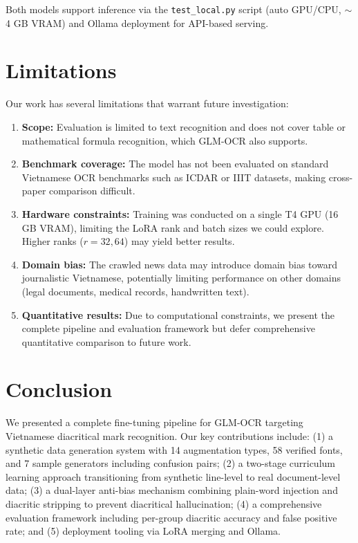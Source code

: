 \documentclass[11pt]{article}
\begin{document}
Both models support inference via the \texttt{test\_local.py} script (auto GPU/CPU, $\sim$4 GB VRAM) and Ollama deployment for API-based serving.

\section{Limitations}

Our work has several limitations that warrant future investigation:

\begin{enumerate}[nosep,leftmargin=*]
    \item \textbf{Scope:} Evaluation is limited to text recognition and does not cover table or mathematical formula recognition, which GLM-OCR also supports.
    \item \textbf{Benchmark coverage:} The model has not been evaluated on standard Vietnamese OCR benchmarks such as ICDAR or IIIT datasets, making cross-paper comparison difficult.
    \item \textbf{Hardware constraints:} Training was conducted on a single T4 GPU (16 GB VRAM), limiting the LoRA rank and batch sizes we could explore. Higher ranks ($r{=}32, 64$) may yield better results.
    \item \textbf{Domain bias:} The crawled news data may introduce domain bias toward journalistic Vietnamese, potentially limiting performance on other domains (legal documents, medical records, handwritten text).
    \item \textbf{Quantitative results:} Due to computational constraints, we present the complete pipeline and evaluation framework but defer comprehensive quantitative comparison to future work.
\end{enumerate}

\section{Conclusion}

We presented a complete fine-tuning pipeline for GLM-OCR targeting Vietnamese diacritical mark recognition. 
Our key contributions include: (1) a synthetic data generation system with 14 augmentation types, 58 verified fonts, and 7 sample generators including confusion pairs; (2) a two-stage curriculum learning approach transitioning from synthetic line-level to real document-level data; (3) a dual-layer anti-bias mechanism combining plain-word injection and diacritic stripping to prevent diacritical hallucination; (4) a comprehensive evaluation framework including per-group diacritic accuracy and false positive rate; and (5) deployment tooling via LoRA merging and Ollama.
\end{document}
